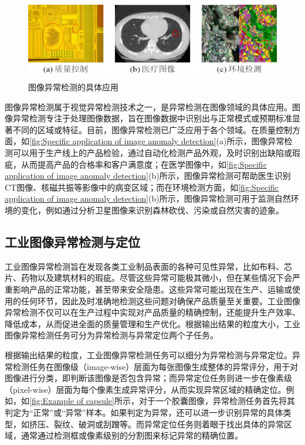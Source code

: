 \documentclass[lang=chs, degree=master, blindreview=false, adobe=false]{yanputhesis}
\begin{document}
\begin{figure}[H]
	\centering
	\includegraphics[width=1\linewidth]{figs/图像异常检测的应用.jpg}
	\caption{图像异常检测的具体应用}
	\label{fig:Specific application of image anomaly detection}
\end{figure}

图像异常检测属于视觉异常检测技术之一，是异常检测在图像领域的具体应用。图像异常检测专注于处理图像数据，旨在图像数据中识别出与正常模式或预期标准显著不同的区域或特征。目前，图像异常检测已广泛应用于各个领域。在质量控制方面，如\autoref{fig:Specific application of image anomaly detection}(a)所示，图像异常检测可以用于生产线上的产品检验，通过自动化检测产品外观，及时识别出缺陷或瑕疵，从而提高产品的合格率和客户满意度；在医学图像中，如\autoref{fig:Specific application of image anomaly detection}(b)所示，图像异常检测可帮助医生识别CT图像、核磁共振等影像中的病变区域；而在环境检测方面，如\autoref{fig:Specific application of image anomaly detection}(b)所示，图像异常检测可用于监测自然环境的变化，例如通过分析卫星图像来识别森林砍伐、污染或自然灾害的迹象。


\subsection{工业图像异常检测与定位}

工业图像异常检测旨在发现各类工业制品表面的各种可见性异常，比如布料、芯片、药物以及建筑材料的瑕疵。尽管这些异常可能极其微小，但在某些情况下会严重影响产品的正常功能，甚至带来安全隐患。这些异常可能出现在生产、运输或使用的任何环节，因此及时准确地检测这些问题对确保产品质量至关重要。工业图像异常检测不仅可以在生产过程中实现对产品质量的精确控制，还能提升生产效率、降低成本，从而促进全面的质量管理和生产优化。根据输出结果的粒度大小，工业图像异常检测任务可分为异常检测与异常定位两个子任务。

根据输出结果的粒度，工业图像异常检测任务可以细分为异常检测与异常定位。异常检测任务在图像级（image-wise）层面为每张图像生成整体的异常评分，用于对图像进行分类，即判断该图像是否包含异常；而异常定位任务则进一步在像素级（pixel-wise）层面为每个像素生成异常评分，从而实现异常区域的精确定位。例如，如\autoref{fig:Example of capsule}所示，对于一个胶囊图像，异常检测任务首先将其判定为“正常”或“异常”样本。如果判定为异常，还可以进一步识别异常的具体类型，如挤压、裂纹、破洞或刮蹭等。而异常定位任务则着眼于找出具体的异常区域，通常通过检测框或像素级别的分割图来标记异常的精确位置。
\end{document}
